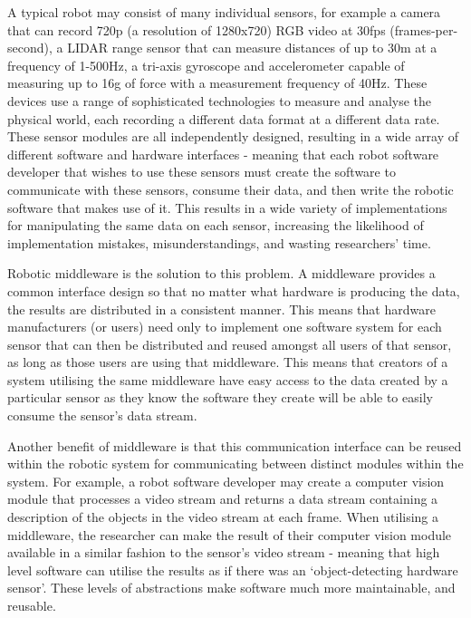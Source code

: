 \documentclass[../dissertation.tex]{subfiles}
\begin{document}
A typical robot may consist of many individual sensors, for example a camera that can record 720p (a resolution of 1280x720) RGB video at 30fps (frames-per-second), a LIDAR range sensor that can measure distances of up to 30m at a frequency of 1-500Hz, a tri-axis gyroscope and accelerometer capable of measuring up to 16g of force with a measurement frequency of 40Hz. These devices use a range of sophisticated technologies to measure and analyse the physical world, each recording a different data format at a different data rate. These sensor modules are all independently designed, resulting in a wide array of different software and hardware interfaces - meaning that each robot software developer that wishes to use these sensors must create the software to communicate with these sensors, consume their data, and then write the robotic software that makes use of it. This results in a wide variety of implementations for manipulating the same data on each sensor, increasing the likelihood of implementation mistakes, misunderstandings, and wasting researchers' time.

Robotic middleware is the solution to this problem. A middleware provides a common interface design so that no matter what hardware is producing the data, the results are distributed in a consistent manner. This means that hardware manufacturers (or users) need only to implement one software system for each sensor that can then be distributed and reused amongst all users of that sensor, as long as those users are using that middleware. This means that creators of a  system utilising the same middleware have easy access to the data created by a particular sensor as they know the software they create will be able to easily consume the sensor's data stream.

Another benefit of middleware is that this communication interface can be reused within the robotic system for communicating between distinct modules within the system. For example, a robot software developer may create a computer vision module that processes a video stream and returns a data stream containing a description of the objects in the video stream at each frame. When utilising a middleware, the researcher can make the result of their computer vision module available in a similar fashion to the sensor's video stream - meaning that high level software can utilise the results as if there was an `object-detecting hardware sensor'. These levels of abstractions make software much more maintainable, and reusable.
\end{document}
